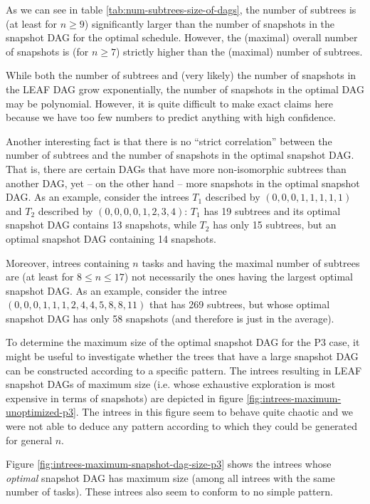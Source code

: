 As we can see in table \ref{tab:num-subtrees-size-of-dags}, the number of subtrees is (at least for $n\geq  9$) significantly larger than the number of snapshots in the snapshot DAG for the optimal schedule. However, the (maximal) overall number of snapshots is (for $n\geq 7$) strictly higher than the (maximal) number of subtrees.

While both the number of subtrees and (very likely) the number of snapshots in the LEAF DAG grow exponentially, the number of snapshots in the optimal DAG may be polynomial. However, it is quite difficult to make exact claims here because we have too few numbers to predict anything with high confidence.

Another interesting fact is that there is no ``strict correlation'' between the number of subtrees and the number of snapshots in the optimal snapshot DAG. That is, there are certain DAGs that have more non-isomorphic subtrees than another DAG, yet -- on the other hand -- more snapshots in the optimal snapshot DAG. As an example, consider the intrees $T_1$ described by $(0,0,0,1,1,1,1,1)$ and $T_2$ described by $(0,0,0,0,1,2,3,4)$: $T_1$ has 19 subtrees and its optimal snapshot DAG contains 13 snapshots, while $T_2$ has only 15 subtrees, but an optimal snapshot DAG containing 14 snapshots.

Moreover, intrees containing $n$ tasks and having the maximal number of subtrees are (at least for $8\leq n \leq 17$) not necessarily the ones having the largest optimal snapshot DAG. As an example, consider the intree $(0,0,0,1,1,1,2,4,4,5,8,8,11)$ that has 269 subtrees, but whose optimal snapshot DAG has only 58 snapshots (and therefore is just in the average).

To determine the maximum size of the optimal snapshot DAG for the P3 case, it might be useful to investigate whether the trees that have a large snapshot DAG can be constructed according to a specific pattern. The intrees resulting in LEAF snapshot DAGs of maximum size (i.e. whose exhaustive exploration is most expensive in terms of snapshots) are depicted in figure \ref{fig:intrees-maximum-unoptimized-p3}. The intrees in this figure seem to behave quite chaotic and we were not able to deduce any pattern according to which they could be generated for general $n$.

Figure \ref{fig:intrees-maximum-snapshot-dag-size-p3} shows the intrees whose \emph{optimal} snapshot DAG has maximum size (among all intrees with the same number of tasks). These intrees also seem to conform to no simple pattern.

